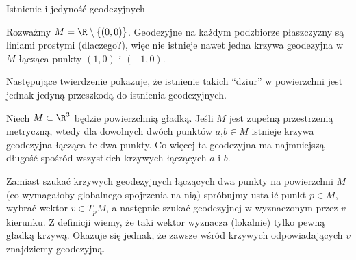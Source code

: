 \begin{frame}{Istnienie i jedyność geodezyjnych}
\begin{przyklad}
Rozważmy $M=\R\setminus\{(0,0)\}$. Geodezyjne na każdym podzbiorze płaszczyzny są liniami prostymi (dlaczego?), więc nie istnieje nawet jedna krzywa geodezyjna w $M$ łącząca punkty $(1,0)$ i $(-1,0)$.
\end{przyklad}

\pause Następujące twierdzenie pokazuje, że istnienie takich ``dziur'' w powierzchni jest jednak jedyną przeszkodą do istnienia geodezyjnych.

\end{frame}
\begin{frame}
\begin{twierdzenie}
Niech $M\subset \R^3$ będzie powierzchnią gładką. Jeśli $M$ jest zupełną przestrzenią metryczną, wtedy dla dowolnych dwóch punktów $a$,$b\in M$ istnieje krzywa geodezyjna łącząca te dwa punkty. Co więcej ta geodezyjna ma najmniejszą długość spośród wszystkich krzywych łączących $a$ i $b$.
\end{twierdzenie}

\end{frame}

Zamiast szukać krzywych geodezyjnych łączących dwa punkty na powierzchni $M$ (co wymagałoby globalnego spojrzenia na nią) spróbujmy ustalić punkt $p\in M$, wybrać wektor $v\in T_pM$, a następnie szukać geodezyjnej w wyznaczonym przez $v$ kierunku. \pause Z definicji wiemy, że taki wektor wyznacza (lokalnie) tylko pewną gładką krzywą. Okazuje się jednak, że zawsze wśród krzywych odpowiadających $v$ znajdziemy geodezyjną.

